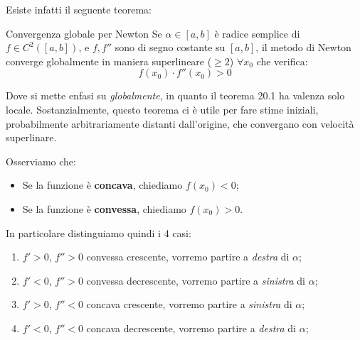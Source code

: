 \documentclass[a4paper,11pt]{article}
\begin{document}
Esiste infatti il seguente teorema:
\begin{theorem}{Convergenza globale per Newton}
	Se $\alpha \in [a, b]$ è radice semplice di $f \in C^2([a, b])$, e $f, f''$ sono di segno costante su $[a, b]$, il metodo di Newton converge globalmente in maniera superlineare ($\geq 2$) $\forall x_0$ che verifica:
	$$
	f(x_0) \cdot f''(x_0) > 0
	$$
\end{theorem}
Dove si mette enfasi su \textit{globalmente}, in quanto il teorema 20.1 ha valenza solo locale.
Sostanzialmente, questo teorema ci è utile per fare stime iniziali, probabilmente arbitrariamente distanti dall'origine, che convergano con velocità superlinare.

Osserviamo che:
\begin{itemize}
	\item Se la funzione è \textbf{concava}, chiediamo $f(x_0) < 0$;
	\item Se la funzione è \textbf{convessa}, chiediamo $f(x_0) > 0$.
\end{itemize}

In particolare distinguiamo quindi i 4 casi:
\begin{enumerate}
	\item $f' > 0$, $f'' > 0$ convessa crescente, vorremo partire a \textit{destra} di $\alpha$;
	\item $f' < 0$, $f'' > 0$ convessa decrescente, vorremo partire a \textit{sinistra} di $\alpha$;
	\item $f' > 0$, $f'' < 0$ concava crescente, vorremo partire a \textit{sinistra} di $\alpha$;
	\item $f' < 0$, $f'' < 0$ concava decrescente, vorremo partire a \textit{destra} di $\alpha$;
\end{enumerate}
\end{document}

